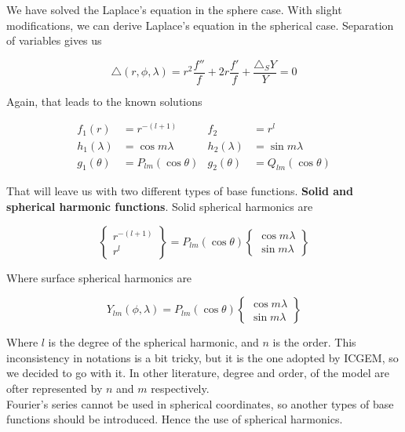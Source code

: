 We have solved the Laplace's equation in the sphere case. With slight modifications, we can derive Laplace's equation in the spherical case. Separation of variables gives us

\begin{equation}
\triangle (r, \phi, \lambda) = r^2 \frac{f''}{f} + 2r \frac{f'}{f} + \frac{\triangle_S Y}{Y} = 0
\end{equation}

Again, that leads to the known solutions

\begin{align*}
f_1(r) &= r^{-(l+1)} & f_2 &= r^l\\
h_1(\lambda) &= \cos m \lambda & h_2(\lambda) &= \sin m \lambda\\
g_1({\theta}) &= P_{lm}(\cos \theta) & g_2(\theta) &= Q_{lm}(\cos \theta)
\end{align*}

That will leave us with two different types of base functions. \textbf{Solid and spherical harmonic functions}. Solid spherical harmonics are

\begin{equation}
\begin{Bmatrix}
r^{-(l+1)} \\
r^l
\end{Bmatrix} = P_{lm}(\cos \theta)
\begin{Bmatrix}
\cos m \lambda \\
\sin m \lambda
\end{Bmatrix}
\end{equation}

Where surface spherical harmonics are

\begin{equation}
Y_{lm}(\phi, \lambda) = P_{lm}(\cos \theta)
\begin{Bmatrix}
\cos m \lambda\\
\sin m \lambda
\end{Bmatrix}
\end{equation}

Where $l$ is the degree of the spherical harmonic, and $n$ is the order. This inconsistency in notations is a bit tricky, but it is the one adopted by ICGEM, so we decided to go with it. In other literature, degree and order, of the model are ofter represented by $n$ and $m$ respectively.
\\
Fourier's series cannot be used in spherical coordinates, so another types of base functions should be introduced. Hence the use of spherical harmonics.

